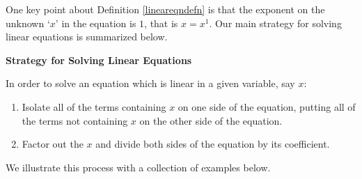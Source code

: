 \documentclass{ximera}
\begin{document}

\pagebreak

One key point about Definition \ref{lineareqndefn} is that the exponent on the unknown `$x$' in the equation is $1$, that is $x = x^1$. Our main strategy for solving linear equations is summarized below.

\medskip

 \label{strategyforsolvinglineareqns}


\centerline{\textbf{Strategy for Solving Linear Equations}}

\vspace{0.05in}

In order to solve an equation which is linear in a given variable, say $x$:

\vspace{-0.1in}

\begin{enumerate}

\item  Isolate all of the terms containing $x$ on one side of the equation, putting all of the terms not containing $x$ on the other side of the equation.

\item  Factor out the $x$ and divide both sides of the equation by its coefficient.

\end{enumerate}


\medskip

We illustrate this process with a collection of examples below.
\end{document}
